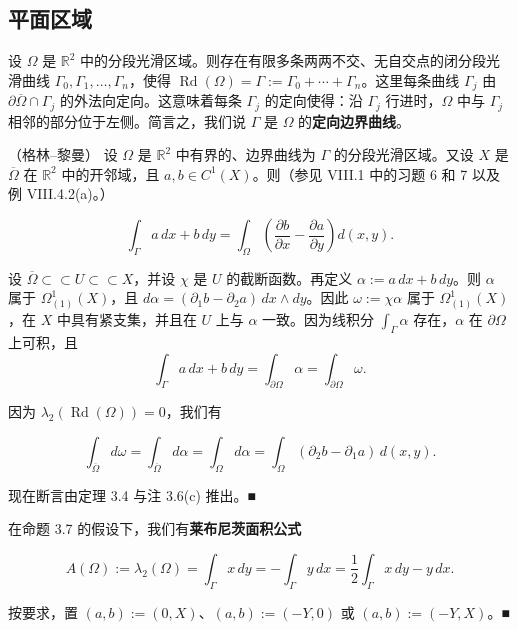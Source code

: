 \subsection*{平面区域}

设 $ \Omega $ 是 $ \mathbb{R}^2 $ 中的分段光滑区域。则存在有限多条两两不交、无自交点的闭分段光滑曲线 $ \Gamma_0,\Gamma_1,\dots,\Gamma_n $，使得 $ \operatorname{Rd}(\Omega) = \Gamma := \Gamma_0+\cdots+\Gamma_n $。这里每条曲线 $ \Gamma_j $ 由 $ \partial\overline{\Omega}\cap\Gamma_j $ 的外法向定向。这意味着每条 $ \Gamma_j $ 的定向使得：沿 $ \Gamma_j $ 行进时，$ \Omega $ 中与 $ \Gamma_j $ 相邻的部分位于左侧。简言之，我们说 $ \Gamma $ 是 $ \Omega $ 的\textbf{定向边界曲线}。


\begin{proposition}

（格林–黎曼） 设 $ \Omega $ 是 $ \mathbb{R}^2 $ 中有界的、边界曲线为 $ \Gamma $ 的分段光滑区域。又设 $ X $ 是 $ \overline{\Omega} $ 在 $ \mathbb{R}^2 $ 中的开邻域，且 $ a,b \in C^1(X) $。则（参见 VIII.1 中的习题 6 和 7 以及例 VIII.4.2(a)。）

\[
\int_{\Gamma} a\,dx + b\,dy = \int_{\Omega}\left(\frac{\partial b}{\partial x} - \frac{\partial a}{\partial y}\right)d(x,y) .
\]

\proofhead
设 $ \overline{\Omega} \subset\subset U \subset\subset X $，并设 $ \chi $ 是 $ U $ 的截断函数。再定义 $ \alpha := a\,dx + b\,dy $。则 $ \alpha $ 属于 $ \Omega^1_{(1)}(X) $，且 $ d\alpha = (\partial_1 b - \partial_2 a)\,dx\wedge dy $。因此 $ \omega := \chi\alpha $ 属于 $ \Omega^1_{(1)}(X) $，在 $ X $ 中具有紧支集，并且在 $ U $ 上与 $ \alpha $ 一致。因为线积分 $ \int_{\Gamma}\alpha $ 存在，$ \alpha $ 在 $ \partial\Omega $ 上可积，且
\[
\int_{\Gamma} a\,dx + b\,dy = \int_{\partial\Omega}\alpha = \int_{\partial\Omega}\omega .
\]

因为 $ \lambda_2(\operatorname{Rd}(\Omega)) = 0 $，我们有

\[
\int_{\overline{\Omega}} d\omega = \int_{\overline{\Omega}} d\alpha = \int_{\Omega} d\alpha = \int_{\Omega}(\partial_2 b - \partial_1 a)\,d(x,y) .
\]

现在断言由定理 3.4 与注 3.6(c) 推出。\nobreak\hspace{0.35em}■

\end{proposition}

\begin{corollary}

在命题 3.7 的假设下，我们有\textbf{莱布尼茨面积公式}

\[
A(\Omega) := \lambda_2(\Omega) = \int_{\Gamma} x\,dy = -\int_{\Gamma} y\,dx = \frac{1}{2}\int_{\Gamma} x\,dy - y\,dx .
\]

\proofhead
按要求，置 $ (a,b) := (0,X) $、$ (a,b) := (-Y,0) $ 或 $ (a,b) := (-Y,X) $。\nobreak\hspace{0.35em}■
\end{corollary}

